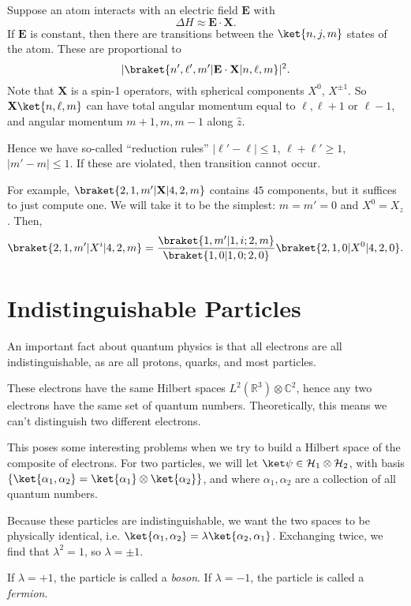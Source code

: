 \documentclass[12pt]{article}
\begin{document}
Suppose an atom interacts with an electric field $\mathbf{E}$ with
\[
\Delta H \approx \mathbf{E} \cdot \mathbf{X}.
\]
If $\mathbf{E}$ is constant, then there are transitions between the $\ket{n, j, m}$ states of the atom. These are proportional to
\[
	|\braket{n',\ell', m' | \mathbf{E} \cdot \mathbf{X} |n, \ell , m}|^2.
\]
Note that $\mathbf{X}$ is a spin-1 operators, with spherical components $X^0$, $X^{\pm 1}$. So $\mathbf{X} \ket{n,\ell , m}$ can have total angular momentum equal to $\ell, \ell + 1$ or $\ell - 1$, and angular momentum $m+1, m, m-1$ along $\hat z$.

Hence we have so-called ``reduction rules'' $|\ell' - \ell| \leq 1$, $\ell +\ell' \geq 1$, $|m' - m| \leq 1$. If these are violated, then transition cannot occur.

For example, $\braket{2, 1, m' | \mathbf{X} | 4, 2, m}$ contains $45$ components, but it suffices to just compute one. We will take it to be the simplest: $m = m' = 0$ and $X^0 = X_z$. Then,
\[
	\braket{2, 1, m'| X^i | 4, 2,m} = \frac{\braket{1, m'|1, i; 2, m}}{\braket{1, 0|1, 0; 2, 0}} \braket{2, 1, 0 | X^0 | 4, 2, 0}.
\]

\newpage

\section{Indistinguishable Particles}
\label{sec:ind_part}

An important fact about quantum physics is that all electrons are all indistinguishable, as are all protons, quarks, and most particles.

These electrons have the same Hilbert spaces $L^2(\mathbb{R}^3) \otimes \mathbb{C}^2$, hence any two electrons have the same set of quantum numbers. Theoretically, this means we can't distinguish two different electrons.

This poses some interesting problems when we try to build a Hilbert space of the composite of electrons. For two particles, we will let $\ket \psi \in \mathcal{H}_1 \otimes \mathcal{H}_2$, with basis $\{\ket{\alpha_1, \alpha_2} = \ket{\alpha_1} \otimes \ket{\alpha_2} \}$, and where $\alpha_1, \alpha_2$ are a collection of all quantum numbers.

Because these particles are indistinguishable, we want the two spaces to be physically identical, i.e. $\ket{\alpha_1, \alpha_2} = \lambda \ket{\alpha_2, \alpha_1}$. Exchanging twice, we find that $\lambda^2 = 1$, so $\lambda = \pm1$.

If $\lambda = +1$, the particle is called a \emph{boson}. If $\lambda = -1$, the particle is called a \emph{fermion}.
\end{document}
